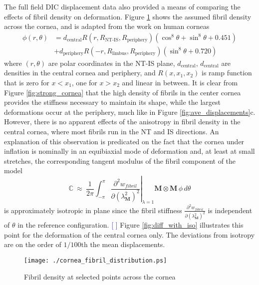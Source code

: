 \documentclass[11pt,oneside]{elsart}
\newcommand{\Mb}{\mathbf{M}}
\newcommand{\figref}[1]{Figure \ref{#1}}
\newcommand{\comment}[1]{\textcolor{blue}{[ \sc{#1} ]}} %
\begin{document}
The full field DIC displacement data also provided a means of comparing
the effects of fibril density on deformation. 
\figref{fig:cornea_fibril_distribution} shows the assumed fibril density
across the cornea, and is adapted from the work \cite{Pinsky2005} on human 
corneas
\begin{equation}\label{eq:full_fibril_distribution}
\begin{split}
  \phi(r,\theta) &= 
d_\text{central} 
R(r,R_\text{NT-IS},R_\text{periphery}) 
( \cos^8\theta + \sin^8\theta+0.451 ) 
\\
&+ 
d_\text{periphery} 
R(-r,R_\text{limbus},R_\text{periphery})
( \sin^8\theta+0.720 ) 
\end{split}
\end{equation}
where $(r,\theta)$ are polar coordinates in the NT-IS plane,
$d_\text{central}$, $d_\text{central}$ are densities in the 
central cornea and periphery, and
$R(x,x_1,x_2)$ is ramp function that is zero for $x <x_1$, one for 
$x > x_2$ and linear in between.
It is clear from \figref{fig:strong_cornea} that the high density of fibrils
in the center cornea provides the stiffness necessary to maintain its shape,
while the largest deformations occur at the periphery, much like in
\figref{fig:ave_displacements}c.
However, there is no apparent effects of the anisotropy in fibril density
in the central cornea, where most fibrils run in the NT and IS directions.
An explanation of this observation is predicated on the fact that the cornea 
under 
inflation is nominally in an equibiaxial mode of deformation and, at
least at small stretches, the corresponding tangent modulus of the fibril
component of the model 
\begin{equation}\label{eq:tangent_moduli}
\mathbb{C} \ \approx \ \frac{1}{2\pi} \int_{-\pi}^{\pi}
\left.
\frac{\partial^2 w_{fibril}}{\partial (\lambda_\Mb^2)^2} \right|_{\lambda=1}
\!\!\!\!\!\!\!
\Mb \otimes \Mb \, \phi \, d\theta
\end{equation}
is approximately isotropic in plane since the fibril stiffness
$\frac{\partial^2 w_{fibril}}{\partial (\lambda_\Mb^2)^2}$ is independent 
of $\theta$ in the reference configuration.
\comment{REJ : need more background here.}
\figref{fig:diff_with_iso} illustrates this point for the deformation
of the central cornea only.
The deviations from isotropy are on the order of $1/100$th the mean
displacements.
%
\begin{figure}[hptb]
\begin{center}
{\texttt{[image: ./cornea\_fibril\_distribution.ps]}} 
  \caption{Fibril density at selected points across the cornea}
  \label{fig:cornea_fibril_distribution}
\end{center}
\end{figure}
\end{document}
